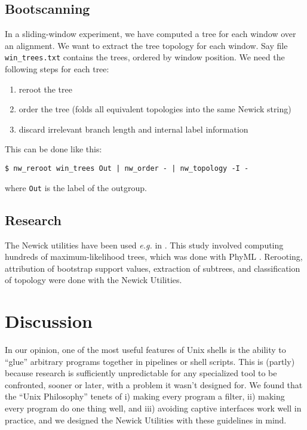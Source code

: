 \documentclass[a4paper,11pt]{article}
\newcommand{\nutils}{Newick Utilities}
\begin{document}
\subsection*{Bootscanning}

In a sliding-window experiment, we have computed a tree for each window over an alignment. We want to extract the tree topology for each window. Say file \texttt{win\_trees.txt} contains the trees, ordered by window position. We need the following steps for each tree:
\begin{enumerate}
 \item reroot the tree
 \item order the tree (folds all equivalent topologies into the same Newick string)
 \item discard irrelevant branch length and internal label information
\end{enumerate}
This can be done like this:
\begin{verbatim}
$ nw_reroot win_trees Out | nw_order - | nw_topology -I -
\end{verbatim}
where \verb|Out| is the label of the outgroup.

\subsection*{Research}

The Newick utilities have been used \textit{e.g.} in \cite{Tapparel2007}. This study involved computing hundreds of maximum-likelihood trees, which was done with PhyML \cite{Guindon2003}. Rerooting, attribution of bootstrap support values, extraction of subtrees, and classification of topology were done with the \nutils{}.
\section*{Discussion}

In our opinion, one of the most useful features of Unix shells is the ability to  ``glue'' arbitrary programs together in pipelines or shell scripts. This is (partly) because research is sufficiently unpredictable for any specialized tool to be confronted, sooner or later, with a problem it wasn't designed for. We found that the ``Unix Philosophy'' tenets of i) making every program a filter, ii) making every program do one thing well, and iii) avoiding captive interfaces work well in practice, and we designed the Newick Utilities with these guidelines in mind.

 

\end{document}
